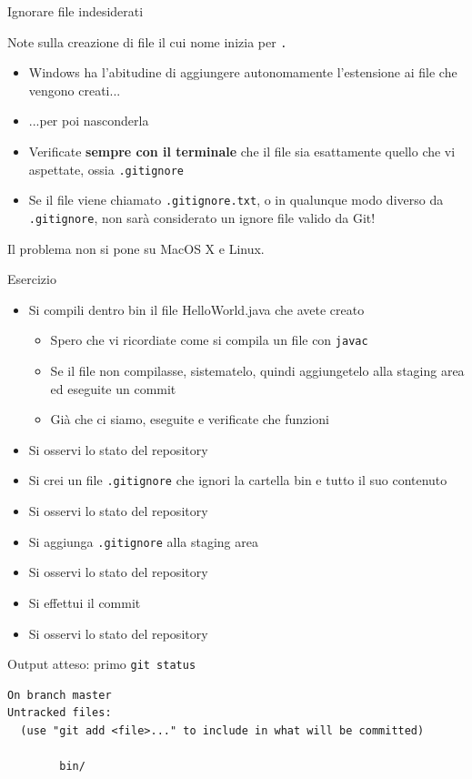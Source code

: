 \documentclass[presentation]{beamer}
\begin{document}
\begin{frame}{Ignorare file indesiderati}
\begin{block}{Note sulla creazione di file il cui nome inizia per \texttt{.}}
		\begin{itemize}
			\item Windows ha l'abitudine di aggiungere autonomamente l'estensione ai file che vengono creati...
			\item ...per poi nasconderla
			\item Verificate \textbf{sempre con il terminale} che il file sia esattamente quello che vi aspettate, ossia \texttt{.gitignore}
			\item Se il file viene chiamato \texttt{.gitignore.txt}, o in qualunque modo diverso da \texttt{.gitignore}, non sarà considerato un ignore file valido da Git!
		\end{itemize}
		Il problema non si pone su MacOS X e Linux.
	\end{block}
	\begin{block}{Esercizio}	
		\begin{itemize}
			\item Si compili dentro bin il file HelloWorld.java che avete creato
			\begin{itemize}
				\item Spero che vi ricordiate come si compila un file con \texttt{javac}
				\item Se il file non compilasse, sistematelo, quindi aggiungetelo alla staging area ed eseguite un commit
				\item Già che ci siamo, eseguite e verificate che funzioni
			\end{itemize}
			\item Si osservi lo stato del repository
			\item Si crei un file \texttt{.gitignore} che ignori la cartella bin e tutto il suo contenuto
			\item Si osservi lo stato del repository
			\item Si aggiunga \texttt{.gitignore} alla staging area
			\item Si osservi lo stato del repository
			\item Si effettui il commit
			\item Si osservi lo stato del repository
		\end{itemize}
	\end{block}
	\begin{block}{Output atteso: primo \texttt{git status}}
		\begin{Verbatim}[fontsize=\scriptsize]
On branch master
Untracked files:
  (use "git add <file>..." to include in what will be committed)

        bin/


\end{Verbatim}
\end{block}
\end{frame}
\end{document}
